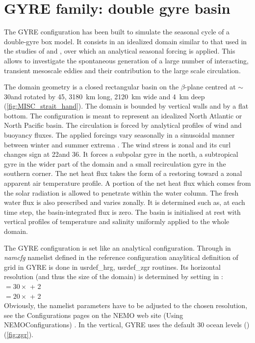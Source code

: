 \documentclass[../tex_main/NEMO_manual]{subfiles}
\begin{document}
\section{GYRE family: double gyre basin }
\label{sec:CFG_gyre}

The GYRE configuration \citep{Levy_al_OM10} has been built to simulate
the seasonal cycle of a double-gyre box model. It consists in an idealized domain 
similar to that used in the studies of \citet{Drijfhout_JPO94} and \citet{Hazeleger_Drijfhout_JPO98, 
Hazeleger_Drijfhout_JPO99, Hazeleger_Drijfhout_JGR00, Hazeleger_Drijfhout_JPO00}, 
over which an analytical seasonal forcing is applied. This allows to investigate the 
spontaneous generation of a large number of interacting, transient mesoscale eddies 
and their contribution to the large scale circulation. 

The domain geometry is a closed rectangular basin on the $\beta$-plane centred 
at $\sim$ 30\degN and rotated by 45\deg, 3180~km long, 2120~km wide 
and 4~km deep (\autoref{fig:MISC_strait_hand}). 
The domain is bounded by vertical walls and by a flat bottom. The configuration is 
meant to represent an idealized North Atlantic or North Pacific basin. 
The circulation is forced by analytical profiles of wind and buoyancy fluxes. 
The applied forcings vary seasonally in a sinusoidal manner between winter 
and summer extrema \citep{Levy_al_OM10}. 
The wind stress is zonal and its curl changes sign at 22\degN and 36\degN. 
It forces a subpolar gyre in the north, a subtropical gyre in the wider part of the domain 
and a small recirculation gyre in the southern corner. 
The net heat flux takes the form of a restoring toward a zonal apparent air 
temperature profile. A portion of the net heat flux which comes from the solar radiation
is allowed to penetrate within the water column. 
The fresh water flux is also prescribed and varies zonally. 
It is determined such as, at each time step, the basin-integrated flux is zero. 
The basin is initialised at rest with vertical profiles of temperature and salinity 
uniformly applied to the whole domain.

The GYRE configuration is set like an analytical configuration. Through  in \textit{namcfg} namelist defined in the reference configuration  anaylitical definition of grid in GYRE is done in usrdef\_hrg, usrdef\_zgr routines. Its horizontal resolution 
(and thus the size of the domain) is determined by setting  in  : \\
 $= 30 \times$  + 2   \\
 $= 20 \times$  + 2   \\
Obviously, the namelist parameters have to be adjusted to the chosen resolution, see the Configurations 
pages on the NEMO web site (Using NEMO\/Configurations) .
In the vertical, GYRE uses the default 30 ocean levels () (\autoref{fig:zgr}).
\end{document}
